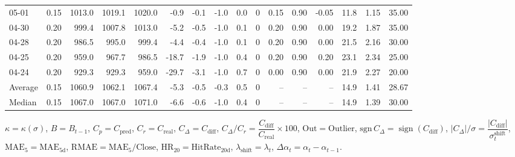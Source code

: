 \begin{threeparttable}
{\begin{tabular}{lrrrrrrrrrrrrrrr}
  05-01 &     0.15 & 1013.0 & 1019.1 & 1020.0 &       -0.9 &           -0.1 &                     -1.0 &                 0.0 &              0 &       0.15 &      0.90 &          -0.05 &             11.8 &            1.15 &                  35.00 \\
  04-30 &     0.20 &  999.4 & 1007.8 & 1013.0 &       -5.2 &           -0.5 &                     -1.0 &                 0.1 &              0 &       0.20 &      0.90 &           0.00 &             19.2 &            1.87 &                  35.00 \\
  04-28 &     0.20 &  986.5 &  995.0 &  999.4 &       -4.4 &           -0.4 &                     -1.0 &                 0.1 &              0 &       0.20 &      0.90 &           0.00 &             21.5 &            2.16 &                  30.00 \\
  04-25 &     0.20 &  959.0 &  967.7 &  986.5 &      -18.7 &           -1.9 &                     -1.0 &                 0.4 &              0 &       0.20 &      0.90 &           0.20 &             23.1 &            2.34 &                  25.00 \\
  04-24 &     0.20 &  929.3 &  929.3 &  959.0 &      -29.7 &           -3.1 &                     -1.0 &                 0.7 &              0 &       0.00 &      0.90 &           0.00 &             21.9 &            2.27 &                  20.00 \\
Average &     0.15 & 1060.9 & 1062.1 & 1067.4 &       -5.3 &           -0.5 &                     -0.3 &                 0.5 &              0 &         -- &        -- &             -- &             14.9 &            1.41 &                  28.67 \\
 Median &     0.15 & 1067.0 & 1067.0 & 1071.0 &       -6.6 &           -0.6 &                     -1.0 &                 0.4 &              0 &         -- &        -- &             -- &             14.9 &            1.39 &                  30.00 \\
\bottomrule
\end{tabular}
}
\begin{tablenotes}\footnotesize
\item $\kappa=\kappa(\sigma)$, $B=B_{t-1}$, $C_p=C_{\text{pred}}$, $C_r=C_{\text{real}}$, $C_\Delta=C_{\text{diff}}$, $C_\Delta/C_r=\dfrac{C_{\text{diff}}}{C_{\text{real}}}\times100$, $\mathrm{Out}=\text{Outlier}$, $\mathrm{sgn}\,C_\Delta=\operatorname{sign}(C_{\text{diff}})$, $|C_\Delta|/\sigma=\dfrac{|C_{\text{diff}}|}{\sigma_t^{\text{shift}}}$, $\mathrm{MAE}_5=\mathrm{MAE}_{5\text{d}}$, $\mathrm{RMAE}= \mathrm{MAE}_5 / \text{Close}$, $\mathrm{HR}_{20}=\mathrm{HitRate}_{20\text{d}}$, 
$\lambda_{\text{shift}}=\lambda_t$, 
$\Delta\alpha_t=\alpha_t-\alpha_{t-1}$.
\end{tablenotes}
\end{threeparttable}
\endgroup

